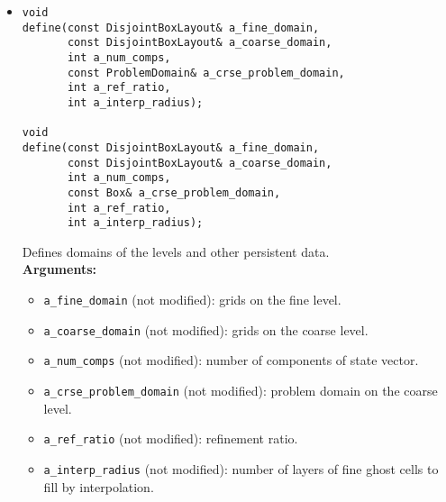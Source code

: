 \begin{itemize}

\item
\begin{verbatim}
void
define(const DisjointBoxLayout& a_fine_domain,
       const DisjointBoxLayout& a_coarse_domain, 
       int a_num_comps,
       const ProblemDomain& a_crse_problem_domain,
       int a_ref_ratio,
       int a_interp_radius);

void
define(const DisjointBoxLayout& a_fine_domain,
       const DisjointBoxLayout& a_coarse_domain, 
       int a_num_comps,
       const Box& a_crse_problem_domain,
       int a_ref_ratio,
       int a_interp_radius);
\end{verbatim}
Defines domains of the levels and other persistent data.  
\\ {\bf Arguments:}
  \begin{itemize}
  \item
  \verb|a_fine_domain| (not modified): grids on the fine level. 
  \item
  \verb|a_coarse_domain| (not modified): grids on the coarse level. 
  \item
  \verb|a_num_comps| (not modified): number of components of state vector. 
  \item
  \verb|a_crse_problem_domain| (not modified): problem domain on the coarse
  level. 
  \item
  \verb|a_ref_ratio| (not modified): refinement ratio.
  \item
  \verb|a_interp_radius| (not modified): number of layers of fine ghost
  cells to fill by interpolation. 
  \end{itemize}


\end{itemize}
